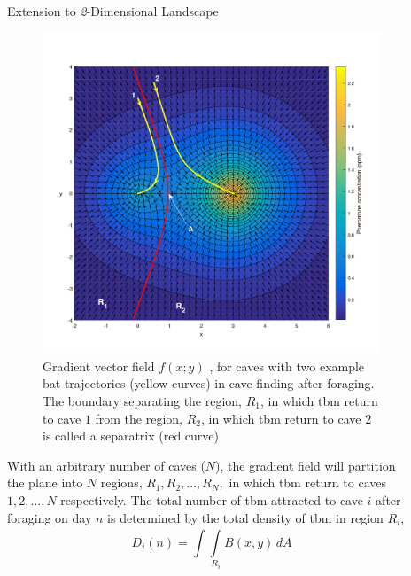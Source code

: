 \documentclass[final]{beamer}
\newlength{\sepwidth}
\newlength{\colwidth}
\newcommand{\separatorcolumn}{\begin{column}{\sepwidth}\end{column}}
\begin{document}
\begin{frame}[t]
\begin{columns}[t]
\begin{column}{\colwidth}
\begin{block}{Extension to \textit{2}-Dimensional Landscape}
 \begin{figure}
 \includegraphics[width = 21cm]{contour.png}
 \caption{Gradient vector field $f(x; y)$ , 
 for caves with two example bat trajectories (yellow
curves) in cave finding after foraging.  The boundary separating the region, $R_1$, in which tbm return to cave $1$ from the
region, $R_2$, in which tbm return to cave $2$ is called a separatrix (red curve)}
 \end{figure}
 With an arbitrary number of caves ($N$), the gradient field will partition the plane into $N$ regions,
$R_1, R_2, ... ,R_N,$ in which tbm return to caves $1, 2, ..., N$ respectively. The total number of tbm attracted to cave $i$ after foraging on day $n$ is determined by the total density of tbm in region $R_i$,
\newcommand{\Int}{\int\limits}
\begin{equation}
    D_i(n) = \Int_ {}^{}\Int_{R_i}^{}B(x,y) \,dA
\end{equation}
  \end{block}
\end{column}

\separatorcolumn

\begin{column}{\colwidth}


\end{column}
\end{columns}
\end{frame}
\end{document}
